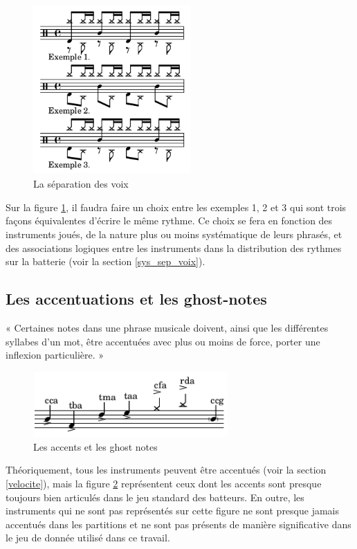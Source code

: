 \begin{figure}[h]
	\centering
	\includegraphics[height=65mm, width=60mm]{
    z_images/3_methodes/0_notation_de_la_batterie/7_voix.png}
	\caption{La séparation des voix}
	\label{sep_voix}
\end{figure}
Sur la figure \ref{sep_voix}, il faudra faire un choix entre les exemples 1, 2
et 3 qui sont trois façons équivalentes d’écrire le même rythme.
Ce choix se fera en fonction des instruments joués, de la nature plus ou moins
systématique de leurs phrasés, et des associations logiques entre les
instruments dans la distribution des rythmes sur la batterie (voir la section
\ref{sys_sep_voix}).

\subsection*{Les accentuations et les ghost-notes}
« Certaines notes dans une phrase musicale doivent, ainsi que les différentes
syllabes d’un mot, être accentuées avec plus ou moins de force, porter une
inflexion particulière. » \cite{danhauser}
\begin{figure}[h]
\centering
\includegraphics[height=25mm, width=75mm]{
z_images/3_methodes/0_notation_de_la_batterie/8_accents_et_ghost-notes_0.png}
\caption{Les accents et les ghost notes}
\label{accents_et_gn}
\end{figure}

Théoriquement, tous les instruments peuvent être accentués (voir la section
\ref{velocite}), mais la figure \ref{accents_et_gn} représentent ceux dont les
accents sont presque toujours bien articulés dans le jeu standard des batteurs.
En outre, les instruments qui ne sont pas représentés sur cette
figure ne sont presque jamais accentués dans les partitions et ne sont pas
présents de manière significative dans le jeu de donnée utilisé dans ce
travail.

